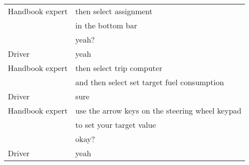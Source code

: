 \begin{table}[H]
\begin{tabular}{p{3cm}p{8cm}}
Handbook expert & then select assignment                                                                                                \\
                  & in the bottom bar                                                                                                     \\
                  & yeah?                                                                                                                 \\
Driver          & yeah                                                                                                                  \\
Handbook expert & then select trip computer                                                                                             \\
                  & and then select set target fuel consumption                                                                            \\
Driver          & sure                                                                                                                  \\
Handbook expert & use the arrow keys on the steering wheel keypad                                                                       \\
                  & to set your target value                                                                                              \\
                  & okay?                                                                                                                 \\
Driver          & yeah                                                                                                                  \\


\end{tabular}
\end{table}

